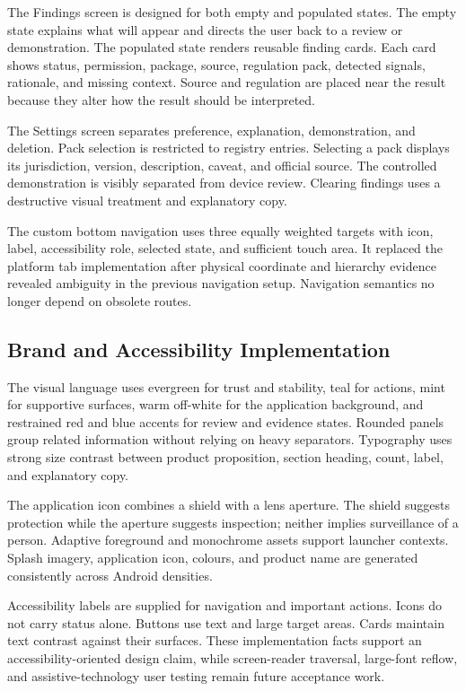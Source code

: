 The Findings screen is designed for both empty and populated states. The empty state explains what will appear and directs the user back to a review or demonstration. The populated state renders reusable finding cards. Each card shows status, permission, package, source, regulation pack, detected signals, rationale, and missing context. Source and regulation are placed near the result because they alter how the result should be interpreted.

The Settings screen separates preference, explanation, demonstration, and deletion. Pack selection is restricted to registry entries. Selecting a pack displays its jurisdiction, version, description, caveat, and official source. The controlled demonstration is visibly separated from device review. Clearing findings uses a destructive visual treatment and explanatory copy.

The custom bottom navigation uses three equally weighted targets with icon, label, accessibility role, selected state, and sufficient touch area. It replaced the platform tab implementation after physical coordinate and hierarchy evidence revealed ambiguity in the previous navigation setup. Navigation semantics no longer depend on obsolete routes.

\subsection{Brand and Accessibility Implementation}

The visual language uses evergreen for trust and stability, teal for actions, mint for supportive surfaces, warm off-white for the application background, and restrained red and blue accents for review and evidence states. Rounded panels group related information without relying on heavy separators. Typography uses strong size contrast between product proposition, section heading, count, label, and explanatory copy.

The application icon combines a shield with a lens aperture. The shield suggests protection while the aperture suggests inspection; neither implies surveillance of a person. Adaptive foreground and monochrome assets support launcher contexts. Splash imagery, application icon, colours, and product name are generated consistently across Android densities.

Accessibility labels are supplied for navigation and important actions. Icons do not carry status alone. Buttons use text and large target areas. Cards maintain text contrast against their surfaces. These implementation facts support an accessibility-oriented design claim, while screen-reader traversal, large-font reflow, and assistive-technology user testing remain future acceptance work.

